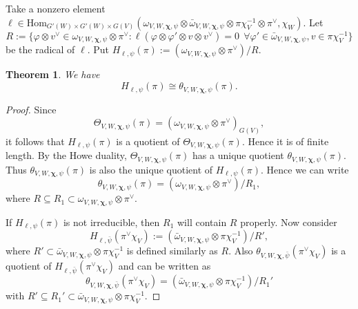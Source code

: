 \documentclass[twoside]{amsart}
\newcommand{\Hom}{{\mathrm{Hom}}} \renewcommand{\Im}{{\mathrm{Im}}}
\theoremstyle{plain}
\newtheorem{thm}{Theorem}[section] \newtheorem{corollary}[thm]{Corollary}
\numberwithin{equation}{section}
\begin{document}
Take a nonzero element $\ell\in \Hom_{G'(W)\times G'(W)\times G(V)} (\omega_{V,W,\boldsymbol{\chi},\psi}\otimes \bar{\omega}_{V,W,\boldsymbol{\chi},\psi} \otimes \pi \chi_V^{-1}\otimes \pi^\vee , \chi_W ) $. Let 
\[
R:=\{ \varphi\otimes v^\vee\in \omega_{V,W,\boldsymbol{\chi},\psi}\otimes \pi^\vee: \ell(\varphi\otimes \varphi'\otimes v\otimes v^\vee)=0 \ \ \forall \varphi'\in \bar{\omega}_{V,W,\boldsymbol{\chi},\psi}, v\in \pi\chi_V^{-1}  \}
\]
be the radical of $\ell$. Put $H_{\ell,\psi}(\pi):= (\omega_{V,W,\boldsymbol{\chi},\psi}\otimes \pi^\vee)/R$.

\begin{thm}
We have 
\[
H_{\ell,\psi}(\pi)\cong \theta_{V,W,\boldsymbol{\chi},\psi}(\pi).
\]
\end{thm}
\begin{proof}
Since 
\[
\Theta_{V,W,\boldsymbol{\chi},\psi}(\pi)=(\omega_{V,W,\boldsymbol{\chi},\psi}\otimes \pi^\vee)_{G(V)},
\]
it follows that $H_{\ell,\psi}(\pi)$ is a quotient of $\Theta_{V,W,\boldsymbol{\chi},\psi}(\pi)$. Hence it is of finite length. By the Howe duality, $\Theta_{V,W,\boldsymbol{\chi},\psi}(\pi)$ has a unique quotient $\theta_{V,W,\boldsymbol{\chi},\psi}(\pi)$. Thus $\theta_{V,W,\boldsymbol{\chi},\psi}(\pi)$ is also the unique quotient of $H_{\ell,\psi}(\pi)$. Hence we can write
\[
\theta_{V,W,\boldsymbol{\chi},\psi}(\pi) = (\omega_{V,W,\boldsymbol{\chi},\psi}\otimes \pi^\vee)/R_1,
\]
where $R\subseteq R_1\subset \omega_{V,W,\boldsymbol{\chi},\psi}\otimes \pi^\vee$.

If $H_{\ell,\psi}(\pi)$ is not irreducible, then $R_1$ will contain $R$ properly. Now consider
\[
H_{\ell, \bar{\psi}}(\pi^\vee \chi_V):=(\bar{\omega}_{V,W,\boldsymbol{\chi},\psi} \otimes \pi \chi_V^{-1} )/R',
\]
where $R'\subset \bar{\omega}_{V,W,\boldsymbol{\chi},\psi} \otimes \pi \chi_V^{-1}$ is defined similarly as $R$. Also $\theta_{V,W,\boldsymbol{\chi},\bar{\psi}}(\pi^\vee \chi_V)$ is a quotient of $H_{\ell,\bar{\psi}}(\pi^\vee \chi_V)$ and can be written as 
\[
\theta_{V,W,\boldsymbol{\chi},\bar{\psi}}(\pi^\vee \chi_V)=(\bar{\omega}_{V,W,\boldsymbol{\chi},\psi} \otimes \pi \chi_V^{-1} )/R_1'
\]
with $R'\subseteq R_1' \subset \bar{\omega}_{V,W,\boldsymbol{\chi},\psi} \otimes \pi \chi_V^{-1} $.


\end{proof}
\end{document}
